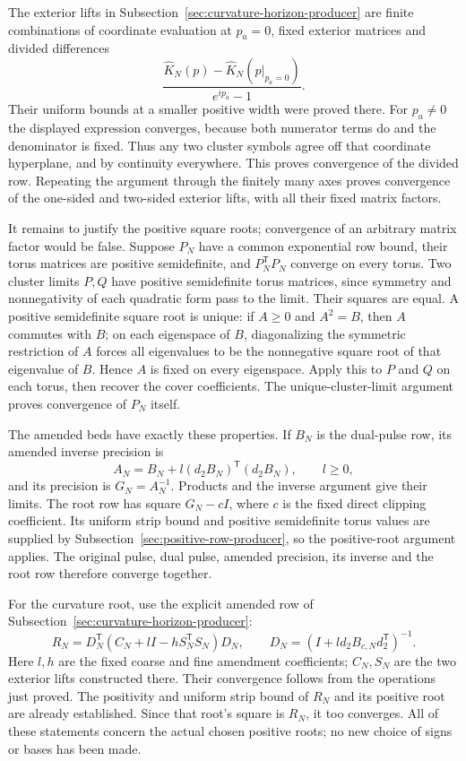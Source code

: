 The exterior lifts in Subsection~\ref{sec:curvature-horizon-producer}
are finite combinations of coordinate evaluation at $p_a=0$,
fixed exterior matrices and divided differences
\[
                \frac{\widehat K_N(p)-\widehat K_N(p|_{p_a=0})}
                     {e^{ip_a}-1}.
\]
Their uniform bounds at a smaller positive width were proved there.
For $p_a\ne0$ the displayed expression converges, because both
numerator terms do and the denominator is fixed. Thus any two
cluster symbols agree off that coordinate hyperplane, and by
continuity everywhere. This proves convergence of the divided
row. Repeating the argument through the finitely many axes proves
convergence of the one-sided and two-sided exterior lifts, with
all their fixed matrix factors.

It remains to justify the positive square roots; convergence of an
arbitrary matrix factor would be false. Suppose $P_N$ have a common
exponential row bound, their torus matrices are positive semidefinite,
and $P_N^{\mathsf T}P_N$ converge on every torus. Two cluster limits
$P,Q$ have positive semidefinite torus matrices, since symmetry and
nonnegativity of each quadratic form pass to the limit. Their
squares are equal. A positive semidefinite square root is unique:
if $A\ge0$ and $A^2=B$, then $A$ commutes with $B$; on each
eigenspace of $B$, diagonalizing the symmetric restriction of $A$
forces all eigenvalues to be the nonnegative square root of that
eigenvalue of $B$. Hence $A$ is fixed on every eigenspace.
Apply this to $P$ and $Q$ on each torus, then recover the cover
coefficients. The unique-cluster-limit argument proves convergence
of $P_N$ itself.

The amended beds have exactly these properties. If $B_N$ is the
dual-pulse row, its amended inverse precision is
\[
 A_N=B_N+l(d_2B_N)^{\mathsf T}(d_2B_N),\qquad l\ge0,
\]
and its precision is $G_N=A_N^{-1}$. Products and the inverse argument
give their limits. The root row has square $G_N-cI$, where $c$ is
the fixed direct clipping coefficient. Its uniform strip bound
and positive semidefinite torus values are supplied by
Subsection~\ref{sec:positive-row-producer}, so the positive-root argument
applies. The original pulse, dual pulse, amended precision, its
inverse and the root row therefore converge together.

For the curvature root, use the explicit amended row of
Subsection~\ref{sec:curvature-horizon-producer}:
\[
 R_N=D_N^{\mathsf T}(C_N+lI-hS_N^{\mathsf T}S_N)D_N,
 \qquad D_N=(I+l d_2 B_{c,N}d_2^{\mathsf T})^{-1}.
\]
Here $l,h$ are the fixed coarse and fine amendment coefficients;
$C_N,S_N$ are the two exterior lifts constructed there. Their
convergence follows from the operations just proved. The positivity
and uniform strip bound of $R_N$ and its positive root are already
established. Since that root's square is $R_N$, it too converges.
All of these statements concern the actual chosen positive roots;
no new choice of signs or bases has been made.

